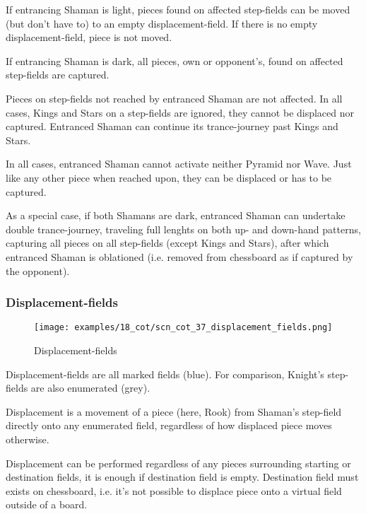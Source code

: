 If entrancing Shaman is light, pieces found on affected step-fields can be moved
(but don't have to) to an empty displacement-field. If there is no empty
displacement-field, piece is not moved.

If entrancing Shaman is dark, all pieces, own or opponent's, found on affected
step-fields are captured.

Pieces on step-fields not reached by entranced Shaman are not affected. In all
cases, Kings and Stars on a step-fields are ignored, they cannot be displaced
nor captured. Entranced Shaman can continue its trance-journey past Kings and Stars.

In all cases, entranced Shaman cannot activate neither Pyramid nor Wave. Just like
any other piece when reached upon, they can be displaced or has to be captured.

As a special case, if both Shamans are dark, entranced Shaman can undertake double
trance-journey, traveling full lenghts on both up- and down-hand patterns, capturing
all pieces on all step-fields (except Kings and Stars), after which entranced Shaman
is oblationed (i.e. removed from chessboard as if captured by the opponent).

\clearpage %

\subsubsection*{Displacement-fields}
\label{sec:Conquest of Tlalocan/Trance-journey/Interactions/Displacement-fields}

\vspace*{-1.5\baselineskip}
\noindent
\begin{figure}[!h]
\texttt{[image: examples/18\_cot/scn\_cot\_37\_displacement\_fields.png]}
\caption{Displacement-fields}
\label{fig:scn_cot_37_displacement_fields}
\end{figure}

Displacement-fields are all marked fields (blue). For comparison, Knight's
step-fields are also enumerated (grey).

Displacement is a movement of a piece (here, Rook) from Shaman's step-field directly
onto any enumerated field, regardless of how displaced piece moves otherwise.

Displacement can be performed regardless of any pieces surrounding starting or
destination fields, it is enough if destination field is empty. Destination field
must exists on chessboard, i.e. it's not possible to displace piece onto a virtual
field outside of a board.

